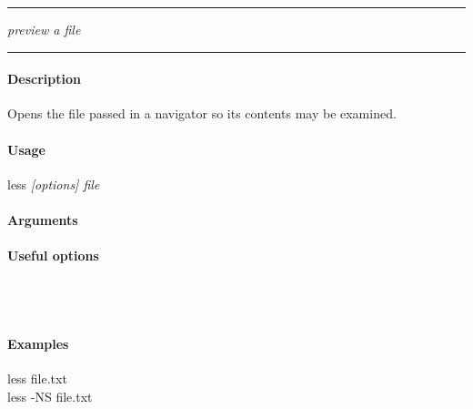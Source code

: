 \hrule
\vspace{1mm}
    {\emph{preview a file}}{}
\hrule
\vspace{4mm}

\paragraph{Description}
\indentpar \raggedright \textrm{Opens the file passed in a navigator so its contents may be examined.}\\

\paragraph{Usage}
\indentpar less \textit{[options] file}

\paragraph{Arguments}
\indentpar {}

\paragraph{Useful options}
\indentpar {}\\
\indentpar {}\\
\indentpar {}


\paragraph{Examples}

\indentpar less file.txt\\
\indentpar less -NS file.txt

\vspace{20mm}